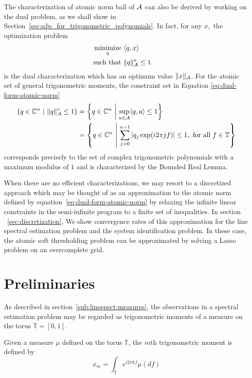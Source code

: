 The characterization of atomic norm ball of $\mathcal{A}$ can also be derived by working
on the dual problem, as we shall show in
Section~\ref{sec:sdp_for_trigonometric_polynomials}. In fact, for any $x,$ the
optimization problem
\begin{equation}
	\label{eq:dual-form-atomic-norm}
	\begin{aligned}
		\mathop{\operatorname{minimize}}_q~ & \langle q, x\rangle &&\\
		\text{such that } & \lVert q\rVert_{\mathcal{A}}^*	 \leq 1.	&&
	\end{aligned}
\end{equation}
is the dual characterization which has an optimum value $\lVert x\rVert_{\mathcal{A}}$. For the atomic set of general trigonometric moments, the constraint set in Equation \eqref{eq:dual-form-atomic-norm}
\begin{align}
	\left\{ q \in \mathbb{C}^n ~\middle|~ \lVert q\rVert_{\mathcal{A}}^* \leq 1 \right\} &
	= \left\{ q \in \mathbb{C}^n ~\middle|~ \sup_{a \in \mathcal{A}}\langle q, a\rangle \leq 1 \right\} \\
	&= \left\{ q \in \mathbb{C}^n ~\middle|~ \sum_{j=0}^{n-1}{|q_j \exp(i 2\pi j f)|} \leq 1, \text{ for all } f \in \mathbb{T} \right\}
\end{align}
corresponds precisely to the set of complex trigonometric polynomials with a
maximum modulus of $1$ and is characterized by the Bounded Real Lemma.

When there are no efficient characterizations, we may resort to a discretized
approach which may be thought of as an approximation to the atomic norm defined
by equation~\eqref{eq:dual-form-atomic-norm} by relaxing the infinite linear
constraints in the semi-infinite program to a finite set of inequalities. In
section ~\ref{sec:discretization}, We show convergence rates of this
approximation for the line spectral estimation problem and the system
identification problem. In these case, the atomic soft thresholding problem can
be approximated by solving a Lasso problem on an overcomplete grid.


\section{Preliminaries} %
\label{sec:preliminaries}

As described in section~\ref{sub:linespect:measures}, the observations in a
spectral estimation problem may be regarded as trigonometric moments of a
measure on the torus $\mathbb{T} = [0,1].$

\begin{definition}
Given a measure $\mu$ defined on the torus $\mathbb{T}$, the $m$th
trigonometric moment is defined by
\begin{equation}
	\label{eq:trig-moment-measure}
	x_m = \int_\mathbb{T} e^{i 2 \pi k f} \mu ( d f)
\end{equation}
\end{definition}


